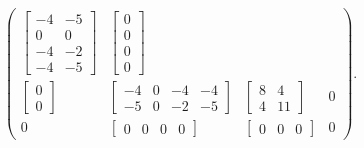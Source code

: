 \begin{Example}{}{}
\[\begin{pmatrix}
\begin{bmatrix}
                                                  -4 & -5 \\
                                                  0  & 0  \\
                                                  -4 & -2 \\
                                                  -4 & -5
                                              \end{bmatrix} & \begin{bmatrix}
                                                                  0 \\0\\0\\0
                                                              \end{bmatrix} \\
            \begin{bmatrix}
                0 \\
                0
            \end{bmatrix} & \begin{bmatrix}
                                -4 & 0 & -4 & -4 \\
                                -5 & 0 & -2 & -5
                            \end{bmatrix} & \begin{bmatrix}
                                                8 & 4  \\
                                                4 & 11
                                            \end{bmatrix} & 0                \\
            0               & \begin{bmatrix}
                                  0 & 0 & 0 & 0
                              \end{bmatrix}     & \begin{bmatrix}
                                                      0 & 0 & 0
                                                  \end{bmatrix} & 0
        \end{pmatrix}. \]
\end{Example}